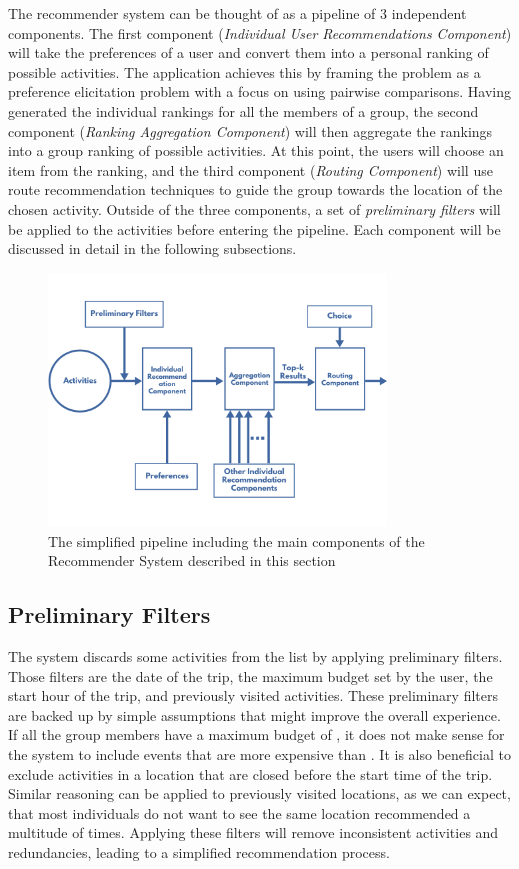 \documentclass[11pt,a4paper,oneside]{article}
\begin{document}
The recommender system can be thought of as a pipeline of 3 independent components. The first component (\emph{Individual User Recommendations Component}) will take the preferences of a user and convert them into a personal ranking of possible activities. The application achieves this by framing the problem as a preference elicitation problem with a focus on using pairwise comparisons. Having generated the individual rankings for all the members of a group, the second component (\emph{Ranking Aggregation Component}) will then aggregate the rankings into a group ranking of possible activities. At this point, the users will choose an item from the ranking, and the third component (\emph{Routing Component}) will use route recommendation techniques to guide the group towards the location of the chosen activity. Outside of the three components, a set of \emph{preliminary filters} will be applied to the activities before entering the pipeline. Each component will be discussed in detail in the following subsections.

\begin{figure}[H]
    \centering
    \includegraphics[width=0.8\textwidth]{paper/imgs/chart_ais.png}
    \caption{The simplified pipeline including the main components of the Recommender System described in this section}
    \label{fig:pipeline}
\end{figure}

\subsection{Preliminary Filters}
The system discards some activities from the list by applying preliminary filters. Those filters are the date of the trip, the maximum budget set by the user, the start hour of the trip, and previously visited activities. These preliminary filters are backed up by simple assumptions that might improve the overall experience. If all the group members have a maximum budget of , it does not make sense for the system to include events that are more expensive than . It is also beneficial to exclude activities in a location that are closed before the start time of the trip. Similar reasoning can be applied to previously visited locations, as we can expect, that most individuals do not want to see the same location recommended a multitude of times. Applying these filters will remove inconsistent activities and redundancies, leading to a simplified recommendation process.
\end{document}
